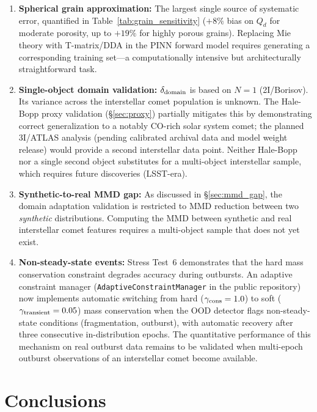 \documentclass[usenatbib]{mnras}
\begin{document}
\begin{enumerate}
    \item \textbf{Spherical grain approximation:} The largest single source of systematic error, quantified in Table~\ref{tab:grain_sensitivity} ($+8\%$ bias on $Q_d$ for moderate porosity, up to $+19\%$ for highly porous grains). Replacing Mie theory with T-matrix/DDA in the PINN forward model requires generating a corresponding training set---a computationally intensive but architecturally straightforward task.
    \item \textbf{Single-object domain validation:} $\delta_{\rm domain}$ is based on $N=1$ (2I/Borisov). Its variance across the interstellar comet population is unknown. The Hale-Bopp proxy validation (\S\ref{sec:proxy}) partially mitigates this by demonstrating correct generalization to a notably CO-rich solar system comet; the planned 3I/ATLAS analysis (pending calibrated archival data and model weight release) would provide a second interstellar data point. Neither Hale-Bopp nor a single second object substitutes for a multi-object interstellar sample, which requires future discoveries (LSST-era).
    \item \textbf{Synthetic-to-real MMD gap:} As discussed in \S\ref{sec:mmd_gap}, the domain adaptation validation is restricted to MMD reduction between two \textit{synthetic} distributions. Computing the MMD between synthetic and real interstellar comet features requires a multi-object sample that does not yet exist.
    \item \textbf{Non-steady-state events:} Stress Test~6 demonstrates that the hard mass conservation constraint degrades accuracy during outbursts. An adaptive constraint manager (\texttt{AdaptiveConstraintManager} in the public repository) now implements automatic switching from hard ($\gamma_{\rm cons}=1.0$) to soft ($\gamma_{\rm transient}=0.05$) mass conservation when the OOD detector flags non-steady-state conditions (fragmentation, outburst), with automatic recovery after three consecutive in-distribution epochs. The quantitative performance of this mechanism on real outburst data remains to be validated when multi-epoch outburst observations of an interstellar comet become available.
\end{enumerate}

\section{Conclusions}\label{sec:conclusions}
\end{document}
